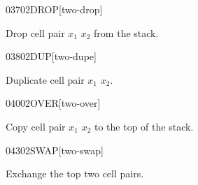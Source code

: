 \begin{newword}{0370}{2DROP}[two-drop]

	Drop cell pair $x_1$ $x_2$ from the stack.
\end{newword}

\begin{newword}{0380}{2DUP}[two-dupe]

	Duplicate cell pair $x_1$ $x_2$.
\end{newword}


\begin{newword}{0400}{2OVER}[two-over]

	Copy cell pair $x_1$ $x_2$ to the top of the stack.
\end{newword}


\begin{newword}{0430}{2SWAP}[two-swap]

	Exchange the top two cell pairs.
\end{newword}


